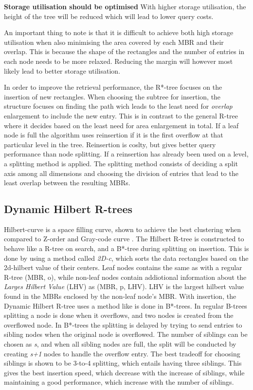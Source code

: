 \textbf{Storage utilisation should be optimised}\newline
With higher storage utilisation, the height of the tree will be reduced which will lead to lower query costs. \newline


An important thing to note is that it is difficult to achieve both high storage utilisation when also minimising the area covered by each MBR and their overlap. This is because the shape of the rectangles and the number of entries in each node needs to be more relaxed. Reducing the margin will however most likely lead to better storage utilisation. \newline

In order to improve the retrieval performance, the R*-tree focuses on the insertion of new rectangles. When choosing the subtree for insertion, the structure focuses on finding the path wich leads to the least need for \emph{overlap} enlargement to include the new entry. This is in contrast to the general R-tree where it decides based on the least need for area enlargement in total. If a leaf node is full the algorithm uses reinsertion if it is the first overflow at that particular level in the tree. Reinsertion is coslty, but gives better query performance than node splitting. If a reinsertion has already been used on a level, a splitting method is applied. The splitting method consists of deciding a split axis among all dimensions and choosing the division of entries that lead to the least overlap between the resulting MBRs.

\subsection{Dynamic Hilbert R-trees}
Hilbert-curve is a space filling curve, shown to achieve the best clustering when compared to Z-order and Gray-code curve \cite{HilbertRTree}. The Hilbert R-tree is constructed to behave like a R-tree on search, and a B*-tree during splitting on insertion. This is done by using a method called \emph{2D-c}, which sorts the data rectangles based on the 2d-hilbert value of their centers. Leaf nodes contains the same as with a regular R-tree (MBR, o), while non-leaf nodes contain addiotional information about the \emph{Larges Hilbert Value} (LHV) as (MBR, p, LHV). LHV is the largest hilbert value found in the MBRs enclosed by the non-leaf node's MBR. With insertion, the Dynamic Hilbert R-tree uses a method like is done in B*-trees. In regular B-trees splitting a node is done when it overflows, and two nodes is created from the overflowed node. In B*-trees the splitting is delayed by trying to send entries to sibling nodes when the original node is overflowed. The number of siblings can be chosen as \emph{s}, and when all sibling nodes are full, the split will be conducted by creating \emph{s+1} nodes to handle the overflow entry. The best tradeoff for choosing siblings is shown to be 3-to-4 splitting, which entails having three siblings. This gives the best insertion speed, which decrease with the increase of siblings, while maintaining a good performance, which increase with the number of siblings. 

